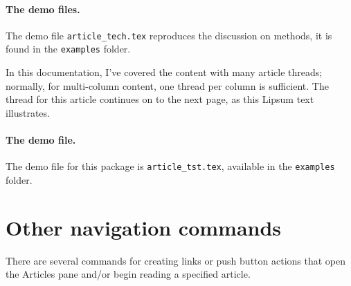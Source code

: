 \documentclass{article}
\let\uif\textsf
\begin{document}
\paragraph*{The demo files.} The demo file \texttt{article\_tech.tex}
reproduces the discussion on methods, it is found in the \texttt{examples}
folder.


\newtopic\noindent In this documentation, I've covered the content with many article threads; normally,
for multi-column content, one thread per column is sufficient. The thread for this article continues
on to the next page, as this Lipsum text illustrates.
\begin{multicols}{2} %
\noindent{}\relax
\lipsum[2]

\lipsum[4]

\noindent{}\indent
\lipsum[6]

\lipsum[7]

\noindent{}\indent
\lipsum[10]

\lipsum[12]

\noindent{}\indent
\lipsum[14]

\lipsum[16]

\end{multicols}

\paragraph*{The demo file.} The demo file for this package is \texttt{article\_tst.tex},
available in the \texttt{examples} folder.

\section{Other navigation commands}

There are several commands for creating links or push button actions that
open the \uif{Articles} pane and/or begin reading a specified article.
\end{document}
